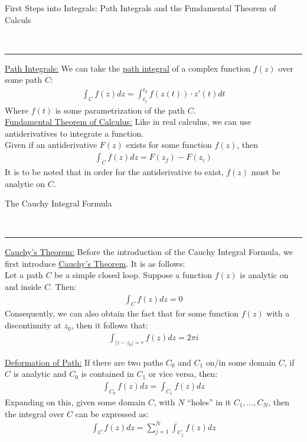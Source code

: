 \documentclass{article}
\newcommand{\header}[1]{\begin{large}\noindent #1\end{large}\\\rule{\textwidth}{0.5pt}}
\newcommand{\gap}{\medskip\\}
\newcommand{\sheader}[1]{\underline{#1:}}
\begin{document}
    \header{First Steps into Integrals: Path Integrals and the Fundamental Theorem of Calculs}
    \sheader{Path Integrals}
    We can take the \underline{path integral} of a complex function $f(z)$ over some 
    path $C$:
    \begin{align*}
        \int_C f(z) dz = \int_{t_1}^{t_2} f(z(t)) \cdot z'(t)dt
    \end{align*}
    Where $f(t)$ is some parametrization of the path $C$.
    \gap
    \sheader{Fundamental Theorem of Calculus}
    Like in real calculus, we can use antiderivatives to integrate a function.
    \gap
    Given if an antiderivative $F(z)$ exists for some function $f(z)$, then 
    \begin{align*}
        \int_C f(z) dz = F(z_f) - F(z_i)
    \end{align*}
    It is to be noted that in order for the antiderivative to exist, 
    $f(z)$ must be analytic on $C$.
    \gap
    \header{The Cauchy Integral Formula}
    \sheader{Cauchy's Theorem} Before the introduction of the Cauchy Integral Formula,
    we first introduce \underline{Cauchy's Theorem}. It is as follows:
    \gap
    Let a path $C$ be a simple closed loop. Suppose a function $f(z)$ is analytic 
    on and inside $C$. Then:
    \begin{align*}
        \int_C f(z)dz = 0
    \end{align*}
    Consequently, we can also obtain the fact that for some function $f(z)$ with a 
    discontinuity at $z_0$, then it follows that:
    \begin{align*}
        \int_{|z - z_0| = r} f(z) dz = 2\pi i
    \end{align*}

    \sheader{Deformation of Path} If there are two paths $C_0$ and $C_1$ on/in some 
    domain $C$, if $C$ is analytic and $C_0$ is contained in $C_1$ or vice versa, 
    then:
    \begin{align*}
        \int_{C_0}f(z)dz = \int_{C_1}f(z)dz
    \end{align*}
    Expanding on this, given some domain $C$, with $N$ ``holes'' in it $C_1, \ldots, C_N$,
    then the integral over $C$ can be expressed as:
    \begin{align*}
        \int_C f(z)dz = \sum_{j = 1}^N \int_{C_j}f(z)dz
    \end{align*}
\end{document}
